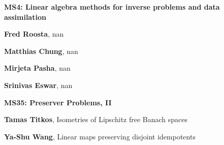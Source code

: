 \documentclass[ILAS2025-program.tex]{subfiles}
\begin{document}
\begin{description}
\begin{description}
        \end{description}
    \begin{description}
    \item[] {\color{mstitle}\textbf{MS4: Linear algebra methods for inverse problems and data assimilation}} 
    \item[] \textbf{Fred Roosta}, nan
        \item[] \textbf{Matthias Chung}, nan
        \item[] \textbf{Mirjeta Pasha}, nan
        \item[] \textbf{Srinivas Eswar}, nan
        \end{description}
    \begin{description}
    \item[] {\color{mstitle}\textbf{MS35: Preserver Problems, II}} 
    \item[] \textbf{Tamas Titkos}, Isometries of Lipschitz free Banach spaces
        \item[] \textbf{Ya-Shu Wang}, Linear maps preserving disjoint idempotents


\end{description}
\end{description}
\end{document}
